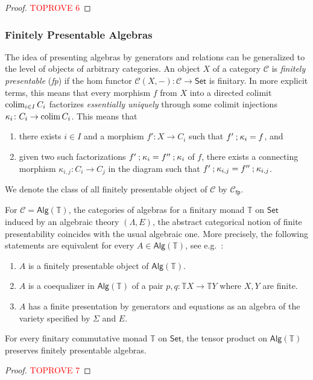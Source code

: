 \documentclass[a4paper, UKenglish, numberwithinsect, thm-restate, cleveref, final]{lipics-v2021}
\theoremstyle{plain}
\theoremstyle{definition}
\newcommand{\C}{\ensuremath{\mathcal{C}}}
\newcommand{\T}{\ensuremath{\mathbb{T}}\xspace}
\newcommand{\seq}{\ensuremath{\mathbin{\text{\upshape;}}}}
\newcommand{\Alg}{\ensuremath{\mathsf{Alg}}}
\newcommand{\Set}{\ensuremath{\mathsf{Set}}\xspace}
\def\colim{\qopname\relax m{colim}}
\newcommand{\fp}{\mathsf{fp}}
\newcommand{\Cfp}{\C_\fp}
\def\colim{\qopname\relax m{colim}}
\numberwithin{equation}{section}
\begin{document}
\begin{proof}\textcolor{red}{TOPROVE 6}\end{proof}

\subsubsection*{Finitely Presentable Algebras} The idea of presenting algebras by generators and relations can be generalized to the level of objects of arbitrary categories. An object \(X\) of a category $\C$ is \emph{finitely presentable} (\emph{fp}) if the hom functor \(\C(X, -)\colon \C\to \Set\) is finitary. In more explicit terms, this means that every morphism $f$ from $X$ into a directed colimit $\colim_{i \in I} C_i$ factorizes \emph{essentially uniquely} through some  colimit injections $\kappa_i\colon C_i \to \colim C_i$. This means that
\begin{enumerate}[(1)]
\item there exists $i \in I$ and a morphism $f'\colon X \to C_i$
  such that $f' \seq \kappa_{i} = f$, and
\item\label{cond:fp-2} given two such factorizations $ f' \seq \kappa_{i} =  f'' \seq \kappa_{i}$
  of $f$, there exists a connecting morphism $\kappa_{i,j}\colon C_i \to
  C_j$ in the diagram such that $f' \seq \kappa_{i,j}  = f'' \seq \kappa_{i,j} $.
\end{enumerate}
We denote the class of all finitely presentable object of \(\C\) by \(\Cfp\). 

For $\C=\Alg(\T)$, the categories of algebras for a finitary monad $\T$ on $\Set$ induced by an algebraic theory $(\Lambda,E)$, the abstract categorical notion of finite presentability coincides with the usual algebraic one. More precisely, the following statements are equivalent for every $A\in \Alg(\T)$, see e.g.~\cite[Prop.~11.28]{arv10}:
\begin{enumerate}[(1)]
\item $A$ is a finitely presentable object of $\Alg(\T)$.
\item $A$ is a coequalizer in $\Alg(\T)$ of a pair $p,q\colon \T X\to \T Y$ where $X,Y$ are finite.
\item $A$ has a finite presentation by generators and equations as an algebra of the variety specified by $\Sigma$ and $E$.
\end{enumerate} 

\begin{proposition}\label{prop:tensor-pres-fp}
  For every finitary commutative monad \(\T\) on \Set, the tensor product on $\Alg(\T)$ preserves finitely presentable algebras.
\end{proposition}
\begin{proof}\textcolor{red}{TOPROVE 7}\end{proof}
\end{document}
